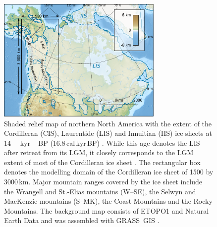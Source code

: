 \documentclass[tc, ms]{copernicus}
\begin{document}
\begin{figure}
  \includegraphics[width=80mm]{cordillera-climate-locmap}
  \caption{Shaded relief map of northern North America with the extent of the Cordilleran (CIS), Laurentide (LIS) and Innuitian (IIS) ice sheets at 14\,\unit{\,kyr\,BP} (16.8\,cal\,kyr\,BP) \citep{dyke-2004}. While this age denotes the LIS after retreat from its LGM, it closely corresponds to the LGM extent of most of the Cordilleran ice sheet \citep{porter-swanson-1998,dyke-2004,stroeven-etal-2010}. The rectangular box denotes the modelling domain of the Cordilleran ice sheet of 1500 by 3000\,km. Major mountain ranges covered by the ice sheet include the Wrangell and St.-Elias mountains (W--SE), the Selwyn and MacKenzie mountains (S--MK), the Coast Mountains and the Rocky Mountains. The background map consists of ETOPO1 \citep{data:etopo1} and Natural Earth Data \citep{data:naturalearth} and was assembled with GRASS~GIS \citep{soft:grass}.}
  \label{fig:locmap}
\end{figure}
\end{document}
